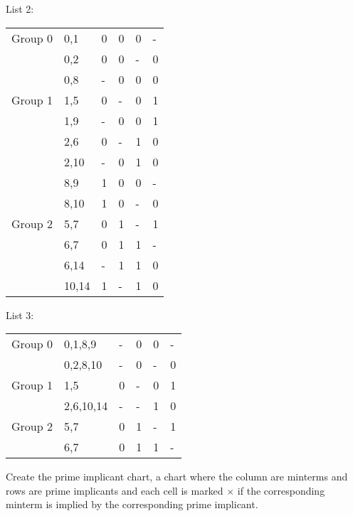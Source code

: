 \documentclass[a4paper,12pt]{article}
\begin{document}
\begin{itemize}
\begin{itemize}
\begin{itemize}
\begin{itemize}
\begin{itemize}
\begin{itemize}
\begin{itemize}
List 2:
\begin{longtable}[c]{|c|m|mmmm|}
\hline
Group 0 & 0,1 & 0 & 0 & 0 & - \\\cline{2-6}
& 0,2 & 0 & 0 & - & 0 \\\cline{2-6}
& 0,8 & - & 0 & 0 & 0 \\\hline
Group 1 & 1,5 & 0 & - & 0 & 1 \\\cline{2-6}
& 1,9 & - & 0 & 0 & 1 \\\cline{2-6}
& 2,6 & 0 & - & 1 & 0 \\\cline{2-6}
& 2,10 & - & 0 & 1 & 0 \\\cline{2-6}
& 8,9 & 1 & 0 & 0 & - \\\cline{2-6}
& 8,10 & 1 & 0 & - & 0 \\\hline
Group 2 & 5,7 & 0 & 1 & - & 1 \\\cline{2-6}
& 6,7 & 0 & 1 & 1 & - \\\cline{2-6}
& 6,14 & - & 1 & 1 & 0 \\\cline{2-6}
& 10,14 & 1 & - & 1 & 0 \\\hline
\end{longtable}

List 3:
\begin{longtable}[c]{|c|m|mmmm|}
\hline
Group 0 & 0,1,8,9 & - & 0 & 0 & - \\\cline{2-6}
& 0,2,8,10 & - & 0 & - & 0 \\\hline
Group 1 & 1,5 & 0 & - & 0 & 1 \\\cline{2-6}
& 2,6,10,14 & - & - & 1 & 0 \\\hline
Group 2 & 5,7 & 0 & 1 & - & 1 \\\cline{2-6}
& 6,7 & 0 & 1 & 1 & - \\\hline
\end{longtable}
Create the prime implicant chart, a chart where the column are minterms and rows are prime implicants and each cell is marked $\times$ if the corresponding minterm is implied by the corresponding prime implicant.


\end{itemize}
\end{itemize}
\end{itemize}
\end{itemize}
\end{itemize}
\end{itemize}
\end{itemize}
\end{document}
